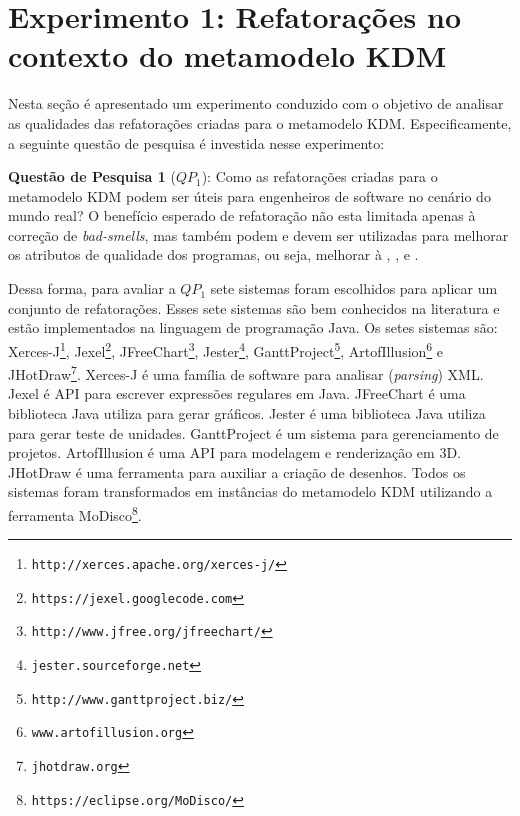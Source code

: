 \section{Experimento 1: Refatorações no contexto do metamodelo KDM}\label{sec:experimento}

Nesta seção é apresentado um experimento conduzido com o objetivo de analisar as qualidades das refatorações criadas para o metamodelo KDM. Especificamente, a seguinte questão de pesquisa é investida nesse experimento:

\textbf{Questão de Pesquisa 1} (\textbf{$QP_1$}): Como as refatorações criadas para o metamodelo KDM podem ser úteis para engenheiros de software no cenário do mundo real? O benefício esperado de refatoração não esta limitada apenas à correção de \textit{bad-smells}, mas também podem e devem ser utilizadas para melhorar os atributos de qualidade dos programas, ou seja, melhorar à , ,  e .


Dessa forma, para avaliar a \textbf{$QP_1$} sete sistemas foram escolhidos para aplicar um conjunto de refatorações. Esses sete sistemas são bem conhecidos na literatura e estão implementados na linguagem de programação Java. Os setes sistemas são: Xerces-J\footnote{\texttt{http://xerces.apache.org/xerces-j/}}, Jexel\footnote{\texttt{https://jexel.googlecode.com}}, JFreeChart\footnote{\texttt{http://www.jfree.org/jfreechart/}}, Jester\footnote{\texttt{jester.sourceforge.net}}, GanttProject\footnote{\texttt{http://www.ganttproject.biz/}}, ArtofIllusion\footnote{\texttt{www.artofillusion.org}} e JHotDraw\footnote{\texttt{jhotdraw.org}}. Xerces-J é uma família de software para analisar (\textit{parsing}) XML. Jexel é API para escrever expressões regulares em Java. JFreeChart é uma biblioteca Java utiliza para gerar gráficos. Jester é uma biblioteca Java utiliza para gerar teste de unidades. GanttProject é um sistema para gerenciamento de projetos. ArtofIllusion é uma API para modelagem e renderização em 3D. JHotDraw é uma ferramenta para auxiliar a criação de desenhos. Todos os sistemas foram transformados em instâncias do metamodelo KDM utilizando a ferramenta MoDisco\footnote{\texttt{https://eclipse.org/MoDisco/}}. 


